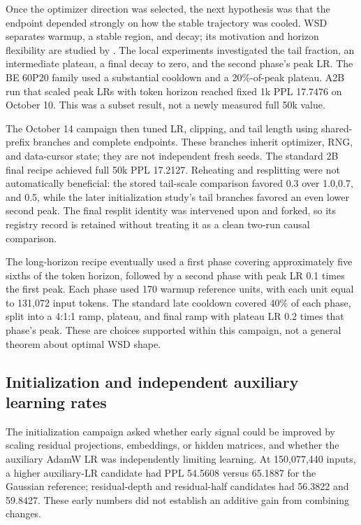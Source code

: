 Once the optimizer direction was selected, the next hypothesis was that the endpoint depended strongly on how the stable trajectory was cooled. WSD separates warmup, a stable region, and decay; its motivation and horizon flexibility are studied by \citet{wsd}. The local experiments investigated the tail fraction, an intermediate plateau, a final decay to zero, and the second phase's peak LR. The BE 60P20 family used a substantial cooldown and a 20\%-of-peak plateau. A2B run that scaled peak LRs with token horizon reached fixed 1k PPL 17.7476 on October 10. This was a subset result, not a newly measured full 50k value.

The October 14 campaign then tuned LR, clipping, and tail length using shared-prefix branches and complete endpoints. These branches inherit optimizer, RNG, and data-cursor state; they are not independent fresh seeds. The standard 2B final recipe achieved full 50k PPL 17.2127. Reheating and resplitting were not automatically beneficial: the stored tail-scale comparison favored 0.3 over 1.0,0.7, and 0.5, while the later initialization study's tail branches favored an even lower second peak. The final resplit identity was intervened upon and forked, so its registry record is retained without treating it as a clean two-run causal comparison.

The long-horizon recipe eventually used a first phase covering approximately five sixths of the token horizon, followed by a second phase with peak LR 0.1 times the first peak. Each phase used 170 warmup reference units, with each unit equal to 131,072 input tokens. The standard late cooldown covered 40\% of each phase, split into a 4:1:1 ramp, plateau, and final ramp with plateau LR 0.2 times that phase's peak. These are choices supported within this campaign, not a general theorem about optimal WSD shape.

\subsection{Initialization and independent auxiliary learning rates}

The initialization campaign asked whether early signal could be improved by scaling residual projections, embeddings, or hidden matrices, and whether the auxiliary AdamW LR was independently limiting learning. At 150,077,440 inputs, a higher auxiliary-LR candidate had PPL 54.5608 versus 65.1887 for the Gaussian reference; residual-depth and residual-half candidates had 56.3822 and 59.8427. These early numbers did not establish an additive gain from combining changes.

